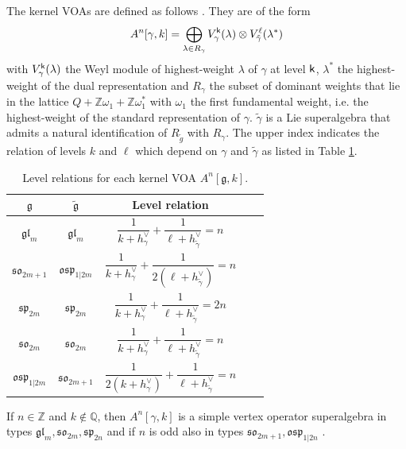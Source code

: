 \documentclass[a4paper, reqno]{amsart}
\theoremstyle{introTheorems}
\newcommand\g\gamma
\renewcommand{\1}{\mathbbold{1}}
\begin{document}
The kernel VOAs are defined as follows \cites{CG, CGL}. They are of the form
\[
A^n[\g, k] = \bigoplus_{\lambda \in R_\g} V^\k_{\g}(\lambda) \otimes V^\ell_{ \tilde \g}(\lambda^*)
\]
with $V^\k_{\g}(\lambda)$ the Weyl module of highest-weight $\lambda$ of $\g$ at level $\mathsf{k}$, $\lambda^*$ the highest-weight of the dual representation and $R_\g$ the subset of dominant weights that lie in the lattice  $Q + \mathbb Z \omega_1 + \mathbb Z \omega_1^*$ with $\omega_1$ the first fundamental weight, i.e. the highest-weight of the standard representation of $\g$. $\tilde \g$ is a Lie superalgebra that admits a natural identification of $R_{\tilde g}$ with $R_\g$. The upper index indicates the relation of levels $k$ and $\ell$  which depend on $\g$ and $\tilde \g$ as listed in Table \ref{tab:kernel-levels}. 
\begin{table}[h]
\centering
\begin{tabular}{|c|c|c|c|c|} \hline 
$\mathfrak{g}$  & $\tilde{\mathfrak{g}}$  & Level relation \\ \hline 

$\mathfrak{gl}_m$ & $\mathfrak{gl}_m$
  & $\dfrac{1}{k+h^\vee_\g}+\dfrac{1}{\ell+h^\vee_{\tilde\g}}=n$
   \\[2ex]
$\mathfrak{so}_{2m+1}$ & $\mathfrak{osp}_{1|2m}$
  & $\dfrac{1}{k+h^\vee_\g}+\dfrac{1}{2(\ell+h^\vee_{\tilde\g})}=n$
   \\[2ex]
$\mathfrak{sp}_{2m}$ & $\mathfrak{sp}_{2m}$
  & $\dfrac{1}{k+h^\vee_\g}+\dfrac{1}{\ell+h^\vee_{\tilde\g}}=2n$
   \\[2ex]
$\mathfrak{so}_{2m}$ & $\mathfrak{so}_{2m}$
  & $\dfrac{1}{k+h^\vee_\g}+\dfrac{1}{\ell+h^\vee_{\tilde\g}}=n$
  \\[2ex]
$\mathfrak{osp}_{1|2m}$ & $\mathfrak{so}_{2m+1}$
  & $\dfrac{1}{2(k+h^\vee_\g)}+\dfrac{1}{\ell+h^\vee_{\tilde\g}}=n$
   \\
\hline 
\end{tabular}
\caption{Level relations for each kernel VOA $A^n[\mathfrak g,k]$.}
\label{tab:kernel-levels}
\end{table}
If $n \in \mathbb Z$ and $k \notin \mathbb Q$, then $A^n[\g, k]$ is  a simple vertex operator superalgebra in types $\mathfrak{gl}_m, \mathfrak{so}_{2m}, \mathfrak{sp}_{2n}$ \cite{Mor} and if $n$ is odd also in types $\mathfrak{so}_{2m+1}, \mathfrak{osp}_{1|2n}$ \cite{CMY-osp}. 
\end{document}
